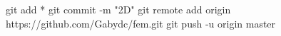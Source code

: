 git add *
git commit -m "2D"
git remote add origin https://github.com/Gabydc/fem.git
git push -u origin master

